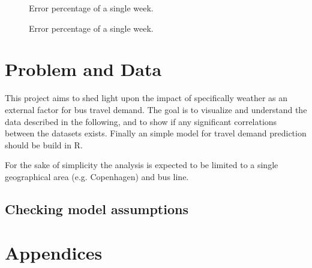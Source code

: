 \documentclass[a4paper,11pt]{article}
\begin{document}
\clearpage

\begin{figure}[!ht]
    \center
    
    \caption{Error percentage of a single week.}
    \label{fig:travelcard_error_pct}
\end{figure}

\begin{figure}[!ht]
    \center
    
    \caption{Error percentage of a single week.}
    \label{fig:weather_rain}
\end{figure}


\clearpage

\section{Problem and Data}\label{ch:data_old}
This project aims to shed light upon the impact of specifically weather as an external factor for bus travel demand. The goal is to visualize and understand the data described in the following, and to show if any significant correlations between the datasets exists. Finally an simple model for travel demand prediction should be build in R.

For the sake of simplicity the analysis is expected to be limited to a single geographical area (e.g. Copenhagen) and bus line.

\subsection{Checking model assumptions}

\clearpage
\begin{spacing}{1}
  
  
\end{spacing}

\clearpage
\appendix
\section*{Appendices}
\renewcommand{\thesubsection}{\Alph{subsection}}


\clearpage

\end{document}
